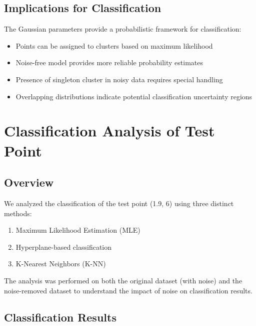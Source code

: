 \documentclass[12pt]{article}
\begin{document}
\subsection{Implications for Classification}
The Gaussian parameters provide a probabilistic framework for classification:
\begin{itemize}
    \item Points can be assigned to clusters based on maximum likelihood
    \item Noise-free model provides more reliable probability estimates
    \item Presence of singleton cluster in noisy data requires special handling
    \item Overlapping distributions indicate potential classification uncertainty regions
\end{itemize}

\section{Classification Analysis of Test Point}

\subsection{Overview}
We analyzed the classification of the test point (1.9, 6) using three distinct methods:
\begin{enumerate}
    \item Maximum Likelihood Estimation (MLE)
    \item Hyperplane-based classification
    \item K-Nearest Neighbors (K-NN)
\end{enumerate}

The analysis was performed on both the original dataset (with noise) and the noise-removed dataset to understand the impact of noise on classification results.

\subsection{Classification Results}
\end{document}
